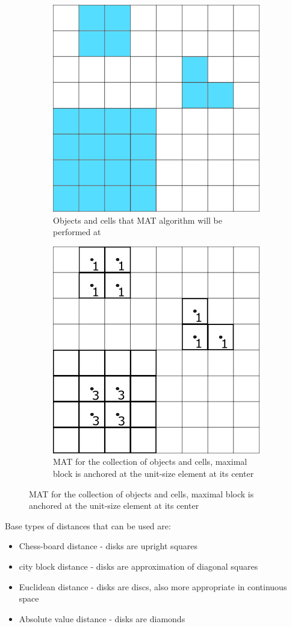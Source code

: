 \begin{figure}
\centering
\begin{subfigure}{.5\textwidth}
 \centering
 \includegraphics[width=.5\linewidth]{MAT_todo.png}
  \caption{Objects and cells that MAT algorithm will be performed at}
  \label{fig:sub1}
\end{subfigure}%
\begin{subfigure}{.5\textwidth}
 \centering
 \includegraphics[width=.5\linewidth]{MAT_done.png}
 \caption{MAT for the collection of objects and cells, maximal block is anchored at the unit-size element at its center}
\end{subfigure}
\end{figure}

Base types of distances that can be used are:
\begin{itemize}
\item Chess-board distance - disks are upright squares
\item city block distance - disks are approximation of diagonal squares
\item Euclidean distance - disks are discs, also more appropriate in continuous space
\item Absolute value distance - disks are diamonds
\end{itemize}

